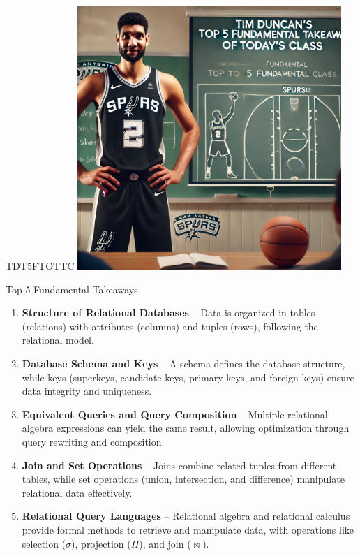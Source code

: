 \documentclass{beamer}
\begin{document}
\begin{frame}{TDT5FTOTTC}
    \centering
    \includegraphics[width=0.75\textwidth]{figures/tim.png}
\end{frame}

\begin{frame}{Top 5 Fundamental Takeaways}
    \small
    \begin{enumerate} \pause
        \item[5] \textbf{Structure of Relational Databases} – Data is organized in tables (relations) with attributes (columns) and tuples (rows), following the relational model. \pause
        \item[4] \textbf{Database Schema and Keys} – A schema defines the database structure, while keys (superkeys, candidate keys, primary keys, and foreign keys) ensure data integrity and uniqueness.\pause
        \item[3] \textbf{Equivalent Queries and Query Composition} – Multiple relational algebra expressions can yield the same result, allowing optimization through query rewriting and composition.\pause
        \item[2] \textbf{Join and Set Operations} – Joins combine related tuples from different tables, while set operations (union, intersection, and difference) manipulate relational data effectively.\pause
        \item[1] \textbf{Relational Query Languages} – Relational algebra and relational calculus provide formal methods to retrieve and manipulate data, with operations like selection ($\sigma$), projection ($\Pi$), and join ($\Join$).\pause
    \end{enumerate}
\end{frame}
\end{document}
